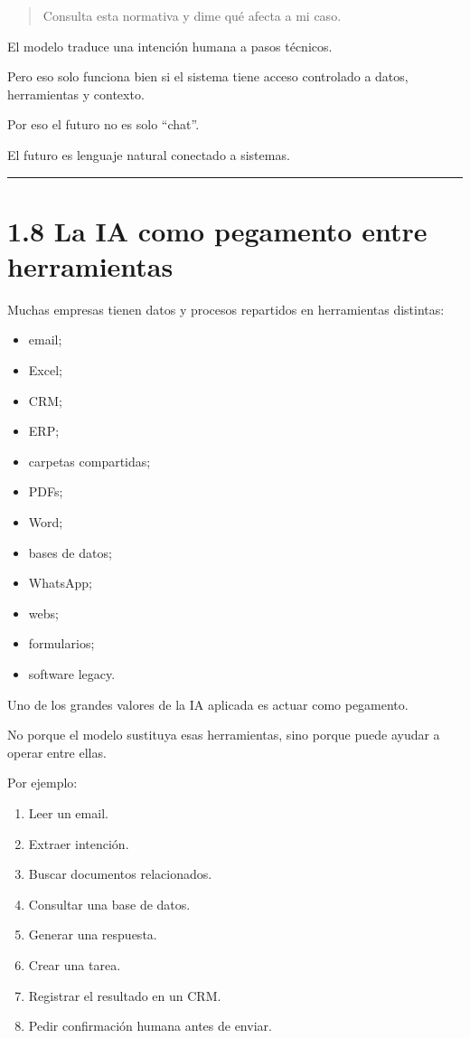 \begin{quote}
Consulta esta normativa y dime qué afecta a mi caso.
\end{quote}

El modelo traduce una intención humana a pasos técnicos.

Pero eso solo funciona bien si el sistema tiene acceso controlado a
datos, herramientas y contexto.

Por eso el futuro no es solo ``chat''.

El futuro es lenguaje natural conectado a sistemas.

\begin{center}\rule{0.5\linewidth}{0.5pt}\end{center}

\section{1.8 La IA como pegamento entre
herramientas}\label{la-ia-como-pegamento-entre-herramientas}

Muchas empresas tienen datos y procesos repartidos en herramientas
distintas:

\begin{itemize}
\tightlist
\item
  email;
\item
  Excel;
\item
  CRM;
\item
  ERP;
\item
  carpetas compartidas;
\item
  PDFs;
\item
  Word;
\item
  bases de datos;
\item
  WhatsApp;
\item
  webs;
\item
  formularios;
\item
  software legacy.
\end{itemize}

Uno de los grandes valores de la IA aplicada es actuar como pegamento.

No porque el modelo sustituya esas herramientas, sino porque puede
ayudar a operar entre ellas.

Por ejemplo:

\begin{enumerate}
\def\labelenumi{\arabic{enumi}.}
\tightlist
\item
  Leer un email.
\item
  Extraer intención.
\item
  Buscar documentos relacionados.
\item
  Consultar una base de datos.
\item
  Generar una respuesta.
\item
  Crear una tarea.
\item
  Registrar el resultado en un CRM.
\item
  Pedir confirmación humana antes de enviar.
\end{enumerate}

